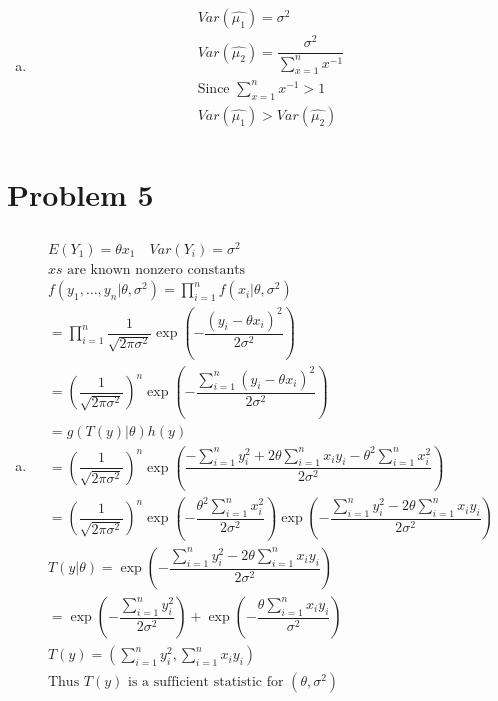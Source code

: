 \documentclass{article}
\begin{document}
\begin{flushleft}
\begin{enumerate}[(a)]
	\item 
\begin{multline*}\\
Var(\hat{\mu_1})=\sigma^2\\
Var(\hat{\mu_2})=\dfrac{\sigma^2}{\sum_{x=1}^{n}x^{-1}}\\
\text{Since } \sum_{x=1}^{n}x^{-1}>1\\
Var(\hat{\mu_1})>Var(\hat{\mu_2})\\
\end{multline*}

\end{enumerate}

	\section*{Problem 5}
\begin{enumerate}[(a)]
	
	\item 
\begin{multline*}\\
E(Y_1)=\theta x_1 \quad Var(Y_i)=\sigma^2\\
xs \text{ are known nonzero constants}\\
f(y_1,\dots, y_n|\theta,\sigma^2)=\prod_{i=1}^{n}f(x_i|\theta,\sigma^2)\\
=\prod_{i=1}^{n}\dfrac{1}{\sqrt{2\pi \sigma^2}}\exp\left(-\dfrac{(y_i-\theta x_i)^2}{2\sigma^2}\right)\\
=\left(\dfrac{1}{\sqrt{2\pi \sigma^2}}\right)^n \exp\left(-\dfrac{\sum_{i=1}^{n}(y_i-\theta x_i)^2}{2\sigma^2}\right)\\
=g(T(y)|\theta)h(y)\\
=\left(\dfrac{1}{\sqrt{2\pi \sigma^2}}\right)^n \exp\left(\dfrac{-\sum_{i=1}^{n}y_i^2+2\theta \sum_{i=1}^{n}x_iy_i-\theta^2\sum_{i=1}^{n}x_i^2}{2\sigma^2}\right)\\
=\left(\dfrac{1}{\sqrt{2\pi \sigma^2}}\right)^n \exp\left(-\dfrac{\theta^2\sum_{i=1}^{n}x_i^2}{2\sigma^2}\right)\exp\left(-\dfrac{\sum_{i=1}^{n}y_i^2-2\theta \sum_{i=1}^{n}x_iy_i}{2\sigma^2}\right)\\
T(y|\theta)=\exp\left(-\dfrac{\sum_{i=1}^{n}y_i^2-2\theta \sum_{i=1}^{n}x_iy_i}{2\sigma^2}\right)\\
=\exp\left(-\dfrac{\sum_{i=1}^{n}y_i^2}{2\sigma^2}\right)+\exp\left(-\dfrac{\theta \sum_{i=1}^{n}x_iy_i}{\sigma^2}\right)\\
T(y)=\left(\sum_{i=1}^{n}y_i^2,\sum_{i=1}^{n}x_iy_i\right)\\
\text{Thus } T(y) \text{ is a sufficient statistic for } (\theta,\sigma^2)\\
\end{multline*}


\end{enumerate}
\end{flushleft}
\end{document}

